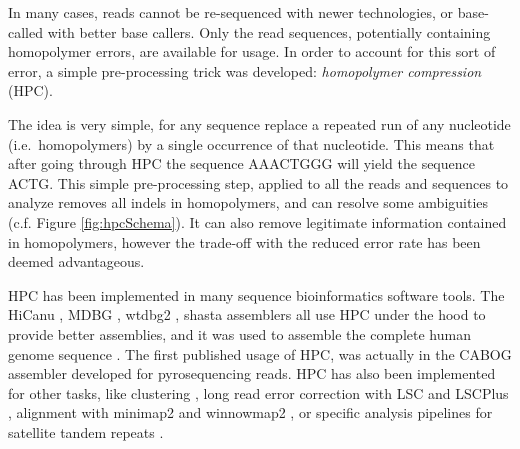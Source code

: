 \documentclass[
  11pt,
  twoside,
  BCOR=10mm,
  listof=totoc]{scrbook}
\begin{document}
In many cases, reads cannot be re-sequenced with newer technologies, or base-called with better base callers. Only the read sequences, potentially containing homopolymer errors, are available for usage. In order to account for this sort of error, a simple pre-processing trick was developed: \emph{homopolymer compression} (HPC).

The idea is very simple, for any sequence replace a repeated run of any nucleotide (i.e.~homopolymers) by a single occurrence of that nucleotide. This means that after going through HPC the sequence AAACTGGG will yield the sequence ACTG. This simple pre-processing step, applied to all the reads and sequences to analyze removes all indels in homopolymers, and can resolve some ambiguities (c.f. Figure \ref{fig:hpcSchema}). It can also remove legitimate information contained in homopolymers, however the trade-off with the reduced error rate has been deemed advantageous.

HPC has been implemented in many sequence bioinformatics software tools. The HiCanu \autocite{nurkHiCanuAccurateAssembly2020}, MDBG \autocite{ekimMinimizerspaceBruijnGraphs2021}, wtdbg2 \autocite{ruanFastAccurateLongread2020}, shasta \autocite{shafinNanoporeSequencingShasta2020} assemblers all use HPC under the hood to provide better assemblies, and it was used to assemble the complete human genome sequence \autocite{nurk2022}. The first published usage of HPC, was actually in the CABOG assembler \autocite{millerAggressiveAssemblyPyrosequencing2008} developed for pyrosequencing reads. HPC has also been implemented for other tasks, like clustering \autocite{sahlinNovoClusteringLongRead2020}, long read error correction with LSC \autocite{auImprovingPacBioLong2012} and LSCPlus \autocite{huLSCplusFastSolution2016}, alignment with minimap2 \autocite{liMinimap2PairwiseAlignment2018} and winnowmap2 \autocite{jainWeightedMinimizerSampling2020}, or specific analysis pipelines for satellite tandem repeats \autocite{vannesteForensicSTRAnalysis2012}.
\end{document}
